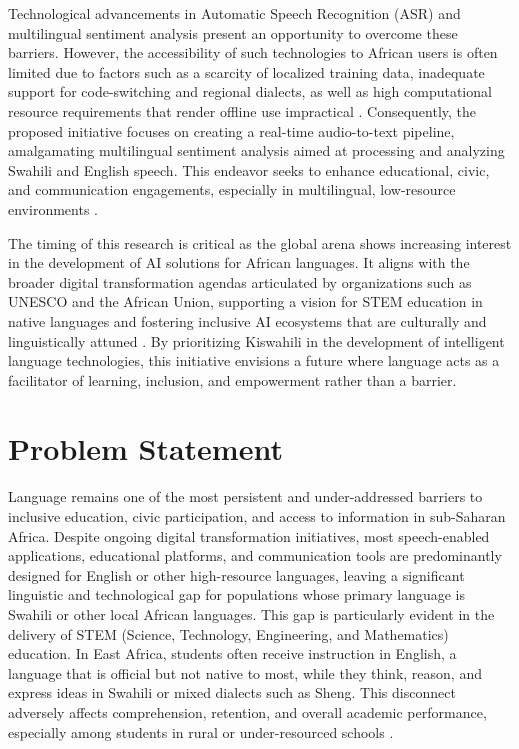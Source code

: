 \noindent Technological advancements in Automatic Speech Recognition (ASR) and multilingual sentiment analysis present an opportunity to overcome these barriers. However, the accessibility of such technologies to African users is often limited due to factors such as a scarcity of localized training data, inadequate support for code-switching and regional dialects, as well as high computational resource requirements that render offline use impractical \cite{alharbi2021automatic}. Consequently, the proposed initiative focuses on creating a real-time audio-to-text pipeline, amalgamating multilingual sentiment analysis aimed at processing and analyzing Swahili and English speech. This endeavor seeks to enhance educational, civic, and communication engagements, especially in multilingual, low-resource environments \cite{pratama2024analysis}.


\noindent The timing of this research is critical as the global arena shows increasing interest in the development of AI solutions for African languages. It aligns with the broader digital transformation agendas articulated by organizations such as UNESCO and the African Union, supporting a vision for STEM education in native languages and fostering inclusive AI ecosystems that are culturally and linguistically attuned \cite{asare2020equitable}. By prioritizing Kiswahili in the development of intelligent language technologies, this initiative envisions a future where language acts as a facilitator of learning, inclusion, and empowerment rather than a barrier.

\section{Problem Statement}
Language remains one of the most persistent and under-addressed barriers to inclusive education, civic participation, and access to information in sub-Saharan Africa. Despite ongoing digital transformation initiatives, most speech-enabled applications, educational platforms, and communication tools are predominantly designed for English or other high-resource languages, leaving a significant linguistic and technological gap for populations whose primary language is Swahili or other local African languages. This gap is particularly evident in the delivery of STEM (Science, Technology, Engineering, and Mathematics) education. In East Africa, students often receive instruction in English, a language that is official but not native to most, while they think, reason, and express ideas in Swahili or mixed dialects such as Sheng. This disconnect adversely affects comprehension, retention, and overall academic performance, especially among students in rural or under-resourced schools \cite{pembe2023environment}.

